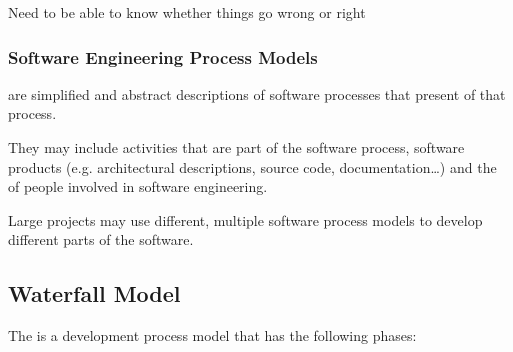 \documentclass[
    ../../Software_Engineering_Summary.tex,
]
{subfiles}
\begin{document}
\begin{defbox}
    Need to be able to know whether things go wrong or right
\end{defbox}

\subsubsection{Software Engineering Process Models}
 are simplified and abstract descriptions of software processes that present  of that process. 

They may include activities that are part of the software process, software products (e.g. architectural descriptions, source code, documentation\dots) and the  of people involved in software engineering.

Large projects may use different, multiple software process models to develop different parts of the software.

\newpage
\subsection{Waterfall Model}
The  is a  development process model that has the following phases:
\end{document}
